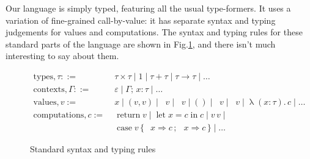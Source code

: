 \documentclass[acmsmall, screen, nonacm]{acmart}
\theoremstyle{definition}
\newcommand{\seq}{\,;\,}
\newcommand{\fst}{\mathop{\pi_1}}
\newcommand{\snd}{\mathop{\pi_2}}
\newcommand{\inl}[1]{\mathop{\mathrm{in}_L} #1}
\newcommand{\inr}[1]{\mathop{\mathrm{in}_R} #1}
\newcommand{\case}[5]{\mathop{\mathrm{case}} #1 \,\{\,\inl{#2} \Rightarrow #3 \seq \inr{#4} \Rightarrow #5 \,\}}
\newcommand{\abs}[3]{\mathop{\lambda}(#1 \types #2).\,#3}
\newcommand{\app}[2]{#1\,#2}
\newcommand{\types}{\mathrel{:}}
\newcommand{\cempty}{\varepsilon}
\newcommand{\ccons}[2]{#1;\,#2}
\newcommand{\lbind}[3]{\ccons{#1}{#2\types#3}}
\newcommand{\return}[1]{\mathop{\mathrm{return}} #1}
\newcommand{\letv}[3]{\mathop{\mathrm{let}} #1 = #2 \mathop{\mathrm{in}} #3}
\newcommand{\turnv}{\mathrel{\vdash_V}}
\newcommand{\turnc}{\mathrel{\vdash_C}}
\begin{document}
Our language is simply typed, featuring all the usual type-formers. It
uses a variation of fine-grained call-by-value: it has separate syntax
and typing judgements for values and computations. The syntax and typing
rules for these standard parts of the language are shown in
Fig.\ref{fig:typing-standard}, and there isn't much interesting to say
about them.
\begin{figure}
\begin{align*}
  \mathrm{types}, \tau ::=\;& \tau \times \tau \mid 1 \mid \tau + \tau
                              \mid \tau \rightarrow \tau \mid \ldots \\
  \mathrm{contexts}, \Gamma ::=\;& \cempty \mid \lbind{\Gamma}{x}{\tau} \mid \ldots \\
  \mathrm{values}, v :=\;& x \mid (v, v) \mid \fst v \mid \snd v
                           \mid () \mid \inl{v} \mid \inr{v} \mid \abs{x}{\tau}{c} \mid \ldots \\
  \mathrm{computations}, c :=\;& \return{v} \mid \letv{x}{c}{c}
                                 \mid \app{v}{v} \mid \\
                            & \case{v}{x}{c}{x}{c} \mid \ldots
\end{align*}
\caption{Standard syntax and typing rules}
\label{fig:typing-standard}
\end{figure}
\end{document}
